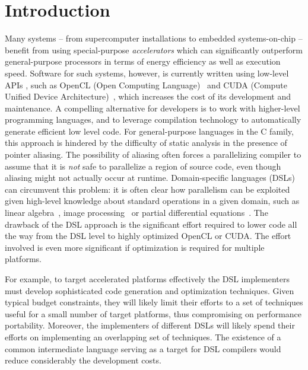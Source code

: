\section{Introduction}

Many systems -- from supercomputer installations to embedded
systems-on-chip -- benefit from using special-purpose
{\em accelerators} which can significantly outperform general-purpose
processors in terms of energy efficiency as well as
execution speed.
Software for such systems, however, is currently written using
low-level APIs ,
such as OpenCL (Open Computing Language)~\cite{stoneopencl} and
CUDA (Compute Unified Device Architecture)~\cite{cudaref},
which increases the cost of
its development and maintenance.
A compelling alternative for developers is to work with higher-level
programming languages, and to leverage compilation technology to automatically
generate efficient low level code.
For general-purpose languages in the C family, this approach is hindered
by the difficulty of static analysis in the presence of pointer aliasing.
The possibility of aliasing often forces a parallelizing compiler
to assume that it is \emph{not} safe to parallelize a region of source
code, even though aliasing might not actually
occur at runtime.
%
Domain-specific languages (DSLs) can circumvent this problem: it is often
clear how parallelism can be exploited given
high-level knowledge about standard operations in a given domain, such as
linear algebra~\cite{vobla2014},
image processing~\cite{DBLP:conf/pldi/Ragan-KelleyBAPDA13}
or partial differential equations~\cite{DBLP:journals/toms/AlnaesLORW14}.
The drawback of the DSL approach is the significant effort required to
lower code all the way from the DSL level to highly optimized OpenCL or CUDA.
The effort involved is even more significant if optimization is required
for multiple platforms.

For example, to target accelerated platforms effectively
the DSL implementers must develop sophisticated code generation and
optimization techniques.  Given typical budget constraints, they will
likely limit their efforts to a set of techniques useful for a small
number of target platforms, thus
compromising on performance portability.  Moreover, the implementers
of different DSLs will likely spend their efforts on implementing an
overlapping set of techniques.
The existence of a common intermediate language serving as a target
for DSL compilers would reduce considerably the development costs.

